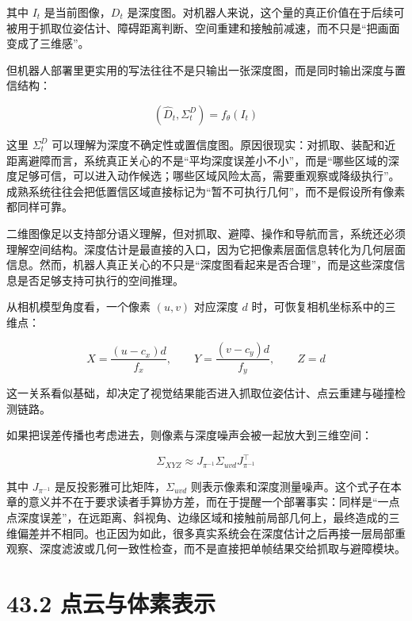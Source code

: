 其中 \(I_t\) 是当前图像，\(D_t\) 是深度图。对机器人来说，这个量的真正价值在于后续可被用于抓取位姿估计、障碍距离判断、空间重建和接触前减速，而不只是“把画面变成了三维感”。

但机器人部署里更实用的写法往往不是只输出一张深度图，而是同时输出深度与置信结构：

\begin{equation*}
(\hat{D}_t, \Sigma_t^{D}) = f_\theta(I_t)
\end{equation*}

这里 \(\Sigma_t^{D}\) 可以理解为深度不确定性或置信度图。原因很现实：对抓取、装配和近距离避障而言，系统真正关心的不是“平均深度误差小不小”，而是“哪些区域的深度足够可信，可以进入动作候选；哪些区域风险太高，需要重观察或降级执行”。成熟系统往往会把低置信区域直接标记为“暂不可执行几何”，而不是假设所有像素都同样可靠。

二维图像足以支持部分语义理解，但对抓取、避障、操作和导航而言，系统还必须理解空间结构。深度估计是最直接的入口，因为它把像素层面信息转化为几何层面信息。然而，机器人真正关心的不只是“深度图看起来是否合理”，而是这些深度信息是否足够支持可执行的空间推理。

从相机模型角度看，一个像素 \((u,v)\) 对应深度 \(d\) 时，可恢复相机坐标系中的三维点：

\begingroup
\footnotesize
\begin{equation*}
X = \frac{(u-c_x)d}{f_x}, \qquad
Y = \frac{(v-c_y)d}{f_y}, \qquad
Z = d
\end{equation*}
\endgroup

这一关系看似基础，却决定了视觉结果能否进入抓取位姿估计、点云重建与碰撞检测链路。

如果把误差传播也考虑进去，则像素与深度噪声会被一起放大到三维空间：

\begingroup
\footnotesize
\begin{equation*}
\Sigma_{XYZ} \approx J_{\pi^{-1}} \Sigma_{uvd} J_{\pi^{-1}}^\top
\end{equation*}
\endgroup

其中 \(J_{\pi^{-1}}\) 是反投影雅可比矩阵，\(\Sigma_{uvd}\) 则表示像素和深度测量噪声。这个式子在本章的意义并不在于要求读者手算协方差，而在于提醒一个部署事实：同样是“一点点深度误差”，在远距离、斜视角、边缘区域和接触前局部几何上，最终造成的三维偏差并不相同。也正因为如此，很多真实系统会在深度估计之后再接一层局部重观察、深度滤波或几何一致性检查，而不是直接把单帧结果交给抓取与避障模块。

\section*{43.2 点云与体素表示}


